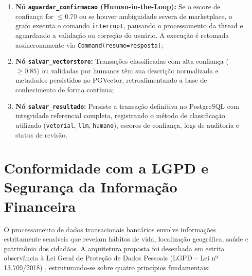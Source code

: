 \documentclass[
	12pt,				
	openright,			
	oneside,			
	a4paper,			
	english,			
	brazil				
	]{abntex2}
\begin{document}
\begin{enumerate}
    \item \textbf{Nó \texttt{aguardar\_confirmacao} (Human-in-the-Loop):} Se o escore de confiança for $\le 0.70$ ou se houver ambiguidade severa de marketplace, o grafo executa o comando \texttt{interrupt}, pausando o processamento da thread e aguardando a validação ou correção do usuário. A execução é retomada assincronamente via \texttt{Command(resume=resposta)};
    \item \textbf{Nó \texttt{salvar\_vectorstore}:} Transações classificadas com alta confiança ($\ge 0.85$) ou validadas por humanos têm sua descrição normalizada e metadados persistidos no PGVector, retroalimentando a base de conhecimento de forma contínua;
    \item \textbf{Nó \texttt{salvar\_resultado}:} Persiste a transação definitiva no PostgreSQL com integridade referencial completa, registrando o método de classificação utilizado (\texttt{vetorial}, \texttt{llm}, \texttt{humano}), escores de confiança, logs de auditoria e status de revisão.
\end{enumerate}

\section{Conformidade com a LGPD e Segurança da Informação Financeira}
\label{sec:sol_lgpd}

O processamento de dados transacionais bancários envolve informações estritamente sensíveis que revelam hábitos de vida, localização geográfica, saúde e patrimônio dos cidadãos. A arquitetura proposta foi desenhada em estrita observância à Lei Geral de Proteção de Dados Pessoais (LGPD -- Lei nº 13.709/2018) \cite{brasil2018lgpd}, estruturando-se sobre quatro princípios fundamentais:
\end{document}
